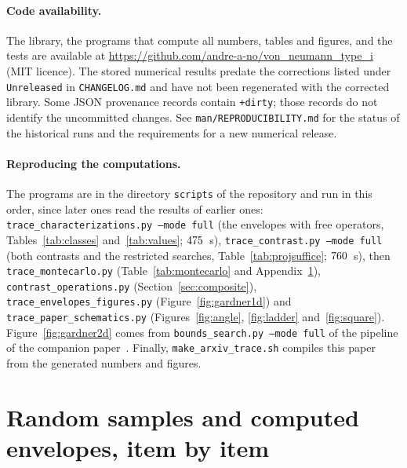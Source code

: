 \documentclass[11pt]{article}
\theoremstyle{plain}
\theoremstyle{definition}
\theoremstyle{remark}
\begin{document}
\paragraph{Code availability.} The library, the programs that compute all numbers, tables and figures, and the tests
are available at \url{https://github.com/andre-a-no/von_neumann_type_i} (MIT licence).
The stored numerical results predate the corrections listed under \texttt{Unreleased} in \texttt{CHANGELOG.md} and
have not been regenerated with the corrected library. Some JSON provenance records contain \texttt{+dirty}; those
records do not identify the uncommitted changes. See \texttt{man/REPRODUCIBILITY.md} for the status of the historical
runs and the requirements for a new numerical release.

\paragraph{Reproducing the computations.} The programs are in the directory \texttt{scripts} of the repository and
run in this order, since later ones read the results of earlier ones:
\texttt{trace\_\allowbreak characterizations.py --mode full} (the envelopes with free operators, Tables~\ref{tab:classes}
and~\ref{tab:values}; $475$~s), \texttt{trace\_\allowbreak contrast.py --mode full} (both contrasts and the
restricted searches, Table~\ref{tab:projsuffice}; $760$~s), then \texttt{trace\_\allowbreak montecarlo.py}
(Table~\ref{tab:montecarlo} and Appendix~\ref{app:mc}), \texttt{contrast\_\allowbreak operations.py}
(Section~\ref{sec:composite}), \texttt{trace\_\allowbreak envelopes\_\allowbreak figures.py}
(Figure~\ref{fig:gardner1d}) and \texttt{trace\_\allowbreak paper\_\allowbreak schematics.py}
(Figures~\ref{fig:angle}, \ref{fig:ladder} and~\ref{fig:square}). Figure~\ref{fig:gardner2d} comes from
\texttt{bounds\_\allowbreak search.py --mode full} of the pipeline of the companion paper~\cite{lib}. Finally,
\texttt{make\_\allowbreak arxiv\_\allowbreak trace.sh} compiles this paper from the generated numbers and figures.

\clearpage
\appendix
\section{Random samples and computed envelopes, item by item}\label{app:mc}
\end{document}
